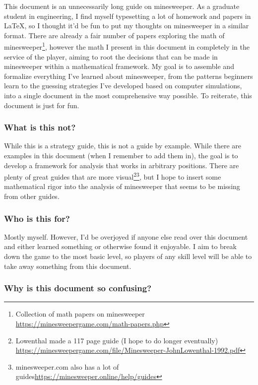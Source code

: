 This document is an unnecessarily long guide on minesweeper. As a graduate student in engineering, I find myself typesetting a lot of homework and papers in LaTeX, so I thought it'd be fun to put my thoughts on minesweeper in a similar format. There are already a fair number of papers exploring the math of minesweeper\footnote{Collection of math papers on minesweeper \url{https://minesweepergame.com/math-papers.php}}, however the math I present in this document in completely in the service of the player, aiming to root the decisions that can be made in minesweeper within a mathematical framework. My goal is to assemble and formalize everything I've learned about minesweeper, from the patterns beginners learn to the guessing strategies I've developed based on computer simulations, into a single document in the most comprehensive way possible. To reiterate, this document is just for fun.\\

\subsubsection*{What is this not?}

While this is a strategy guide, this is not a guide by example. While there are examples in this document (when I remember to add them in), the goal is to develop a framework for analysis that works in arbitrary positions. There are plenty of great guides that are more visual\footnote{Lowenthal made a 117 page guide (I hope to do longer eventually) \\ \url{https://minesweepergame.com/file/Minesweeper-JohnLowenthal-1992.pdf}}\footnote{minesweeper.com also has a lot of guides\url{https://minesweeper.online/help/guides}}, but I hope to insert some mathematical rigor into the analysis of minesweeper that seems to be missing from other guides.\\

\subsubsection*{Who is this for?}

Mostly myself. However, I'd be overjoyed if anyone else read over this document and either learned something or otherwise found it enjoyable. I aim to break down the game to the most basic level, so players of any skill level will be able to take away something from this document.\\

\subsubsection*{Why is this document so confusing?}

